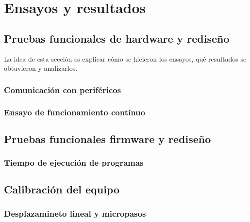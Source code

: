 
\chapter{Ensayos y resultados} %

\label{Chapter4} %


\section{Pruebas funcionales de hardware y rediseño}

La idea de esta sección es explicar cómo se hicieron los ensayos, qué resultados se obtuvieron y analizarlos.
\subsection{Comunicación con periféricos}

\subsection{Ensayo de funcionamiento contínuo}

\section{Pruebas funcionales firmware y rediseño}
\subsection{Tiempo de ejecución de programas}

\section{Calibración del equipo}
\subsection{Desplazamineto lineal y micropasos}

